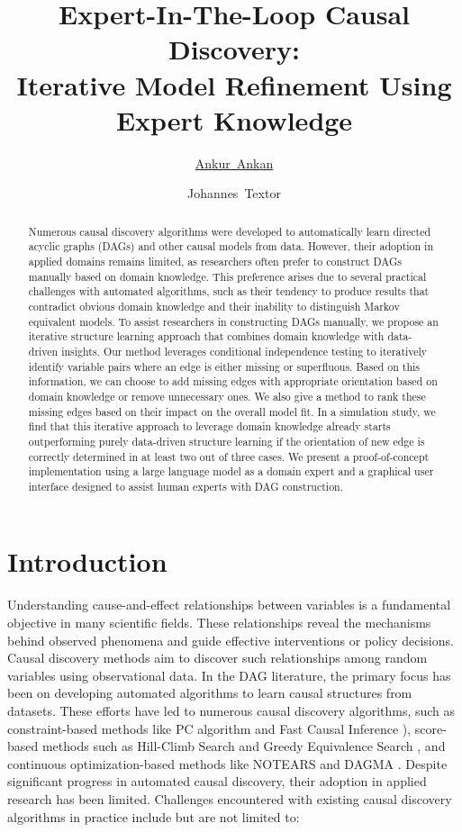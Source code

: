 \documentclass[accepted]{uai2025} %
\title{Expert-In-The-Loop Causal Discovery: \\ Iterative Model Refinement Using Expert Knowledge}
\author[1]{\href{mailto:<ankur.ankan@ru.nl>?Subject=Your UAI 2025 paper}{Ankur~Ankan}{}}
\author[1]{Johannes~Textor}
\affil[1]{%
    Institute for Computing and Information Sciences\\
    Radboud University\\
    Nijmegen, The Netherlands
}
\begin{document}
\maketitle

\begin{abstract}
	Numerous causal discovery algorithms were developed to automatically learn
	directed acyclic graphs (DAGs) and other causal models from data. However,
	their adoption in applied domains remains limited, as researchers often
	prefer to construct DAGs manually based on domain knowledge. This
	preference arises due to several practical challenges with automated
	algorithms, such as their tendency to produce results that contradict
	obvious domain knowledge and their inability to distinguish Markov equivalent
	models. To assist researchers in constructing DAGs manually, we propose an iterative
	structure learning approach that combines domain knowledge with
	data-driven insights. Our method leverages conditional independence
	testing to iteratively identify variable pairs where an edge is
	either missing or superfluous. Based on this information, we can choose
	to add missing edges with appropriate orientation based on domain
	knowledge or remove unnecessary ones. We also give a method to rank
	these missing edges based on their impact on the overall model fit.
	In a simulation study, we find that this iterative approach to leverage domain 
	knowledge already starts outperforming purely data-driven structure learning if 
	the orientation of new edge is correctly determined in at least two out of three cases.
	We present a proof-of-concept implementation using a large language 
	model as a domain expert and a graphical user interface designed to 
	assist human experts with DAG construction.
\end{abstract}

\section{Introduction}
Understanding cause-and-effect relationships between variables is a fundamental
objective in many scientific fields. These relationships reveal the mechanisms
behind observed phenomena and guide effective interventions or policy
decisions. Causal discovery methods aim to discover such relationships among
random variables using observational data. In the DAG literature, the primary
focus has been on developing automated algorithms to learn causal structures
from datasets. These efforts have led to numerous causal discovery algorithms,
such as constraint-based methods like PC algorithm \citep{Spirtes2001,KalischB07} 
and Fast Causal Inference \citep{Spirtes2000}), score-based methods such as Hill-Climb
Search and Greedy Equivalence Search \citep{Chickering2002}, and continuous
optimization-based methods like NOTEARS \citep{Zheng2018} and DAGMA
\citep{Bello2022}. Despite significant progress in automated causal discovery,
their adoption in applied research has been limited. Challenges encountered with existing
causal discovery algorithms in practice include but are not limited to:
\end{document}
